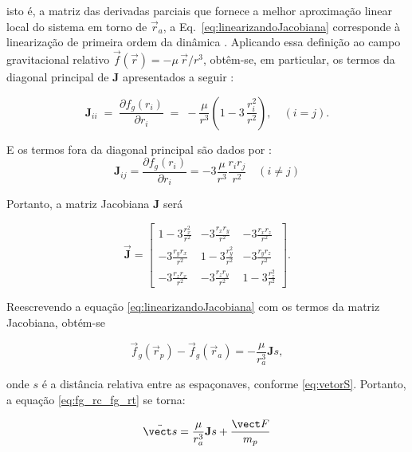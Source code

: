 isto é, a matriz das derivadas parciais que fornece a melhor aproximação linear local do sistema em torno de $\vec r_a$, a Eq.~\eqref{eq:linearizandoJacobiana} corresponde à linearização de primeira ordem da dinâmica \cite{khalil2002nonlinear}. 
Aplicando essa definição ao campo gravitacional relativo $\vec f(\vec r)=-\mu\,\vec r/r^{3}$, obtêm-se, em particular, os termos da diagonal principal de $\mathbf{J}$ apresentados a seguir \cite{fehse2003}:

\begin{equation}
\label{eq:jacobianaDiagonal}
\mathbf{J}_{ii} \;=\;
\frac{\partial f_g(r_i)}{\partial r_i} \;=\;
-\frac{\mu}{r^3}\!\left(1 - 3\,\frac{r_i^2}{r^2}\right), \quad (i=j).
\end{equation}

E os termos fora da diagonal principal são dados por \cite{fehse2003}:
\begin{equation}
\label{eq:jacobianaForaDiagonal}
\mathbf{J}_{ij} =
\frac{\partial f_g(r_i)}{\partial r_i} =
-3 \frac{\mu}{r^3} \frac{r_i r_j}{r^2} \quad (i \neq j)
\end{equation}

Portanto, a matriz Jacobiana $\mathbf{J}$ será

\begin{equation}
    \label{eq:jacobianaGenerica}
\vec {\mathbf{J}} = 
\begin{bmatrix}
1 - 3\frac{r_x^2}{r^2} &  -3\frac{r_x r_y}{r^2} &  -3\frac{r_x r_z}{r^2} \\
-3\frac{r_y r_x}{r^2} & 1 - 3\frac{r_y^2}{r^2} & -3\frac{r_y r_z}{r^2} \\
-3\frac{r_z r_x}{r^2} & -3\frac{r_z r_y}{r^2} & 1 - 3\frac{r_z^2}{r^2}
\end{bmatrix}.
\end{equation}

Reescrevendo a equação \eqref{eq:linearizandoJacobiana} com os termos da matriz Jacobiana, obtém-se

\begin{equation}
\label{eq:linearizandoJacobiana2}
\vec f_g(\vec r_{p}) - \vec f_g(\vec r_{a}) = -\frac{\mu}{r_{a}^3} \mathbf{J}s,
\end{equation}

onde $s$ é a distância relativa entre as espaçonaves, conforme \eqref{eq:vetorS}.
Portanto, a equação \eqref{eq:fg_rc_fg_rt} se torna:

\begin{equation}
\label{eq:fg_rc_fg_rt_linearizada}  
\ddot{\vect s} = \frac{\mu}{r_{a}^3} \mathbf{J}s + \frac{\vect F}{m_{p}}
\end{equation}

